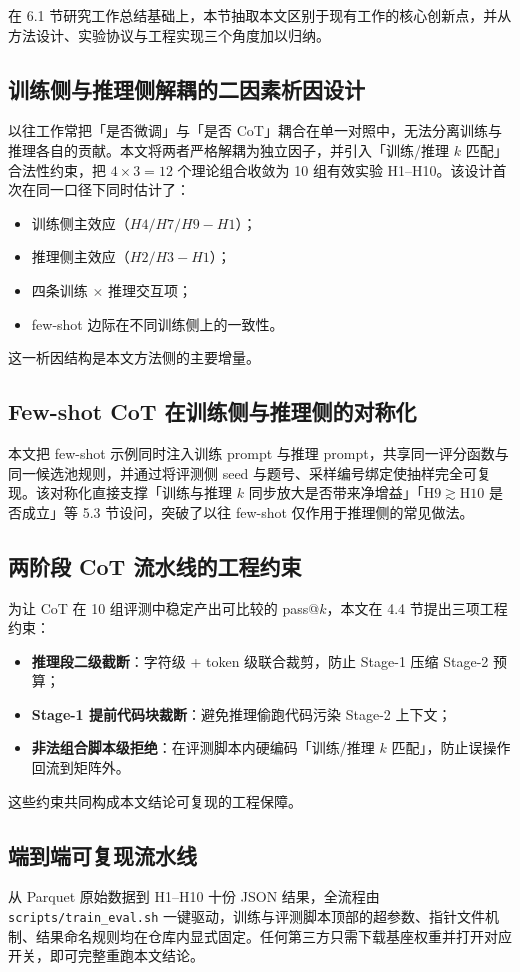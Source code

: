
在 6.1 节研究工作总结基础上，本节抽取本文区别于现有工作的核心创新点，并从方法设计、实验协议与工程实现三个角度加以归纳。

\subsection{训练侧与推理侧解耦的二因素析因设计}
以往工作常把「是否微调」与「是否 CoT」耦合在单一对照中，无法分离训练与推理各自的贡献。本文将两者严格解耦为独立因子，并引入「训练/推理 $k$ 匹配」合法性约束，把 $4 \times 3 = 12$ 个理论组合收敛为 10 组有效实验 H1--H10。该设计首次在同一口径下同时估计了：
\begin{itemize}
    \item 训练侧主效应（$H4/H7/H9 - H1$）；
    \item 推理侧主效应（$H2/H3 - H1$）；
    \item 四条训练 $\times$ 推理交互项；
    \item few-shot 边际在不同训练侧上的一致性。
\end{itemize}
这一析因结构是本文方法侧的主要增量。

\subsection{Few-shot CoT 在训练侧与推理侧的对称化}
本文把 few-shot 示例同时注入训练 prompt 与推理 prompt，共享同一评分函数与同一候选池规则，并通过将评测侧 seed 与题号、采样编号绑定使抽样完全可复现。该对称化直接支撑「训练与推理 $k$ 同步放大是否带来净增益」「$\mathrm{H9} \gtrsim \mathrm{H10}$ 是否成立」等 5.3 节设问，突破了以往 few-shot 仅作用于推理侧的常见做法。

\subsection{两阶段 CoT 流水线的工程约束}
为让 CoT 在 10 组评测中稳定产出可比较的 pass@$k$，本文在 4.4 节提出三项工程约束：
\begin{itemize}
    \item \textbf{推理段二级截断}：字符级 + token 级联合裁剪，防止 Stage-1 压缩 Stage-2 预算；
    \item \textbf{Stage-1 提前代码块裁断}：避免推理偷跑代码污染 Stage-2 上下文；
    \item \textbf{非法组合脚本级拒绝}：在评测脚本内硬编码「训练/推理 $k$ 匹配」，防止误操作回流到矩阵外。
\end{itemize}
这些约束共同构成本文结论可复现的工程保障。

\subsection{端到端可复现流水线}
从 Parquet 原始数据到 H1--H10 十份 JSON 结果，全流程由 \texttt{scripts/train\_eval.sh} 一键驱动，训练与评测脚本顶部的超参数、指针文件机制、结果命名规则均在仓库内显式固定。任何第三方只需下载基座权重并打开对应开关，即可完整重跑本文结论。